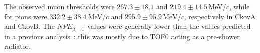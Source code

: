 The observed muon thresholds were $267.3\pm18.1$ and $219.4\pm14.5$\,MeV/$c$, while for pions were $332.2\pm38.4$\,MeV/$c$ and $295.9\pm95.9$\,MeV/$c$, respectively in CkovA and CkovB. The $NPE_{\beta=1}$ values were generally lower than the values predicted in a previous analysis~\cite{NOTE473}: this was mostly due to TOF0 acting as a pre-shower radiator.


